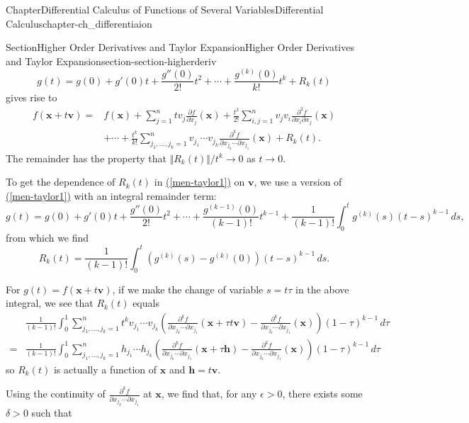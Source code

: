 \documentclass[oneside,10pt,]{book}
\newcommand{\xreffont}{\relax}
\numberwithin{equation}{section}
\newcommand{\bh}{\mathbf{h}}
\newcommand{\bv}{\mathbf{v}}
\newcommand{\bx}{\mathbf{x}}
\newcommand{\amp}{&}
\begin{document}
\begin{chapterptx}{Chapter}{Differential Calculus of Functions of Several Variables}{}{Differential Calculus}{}{}{chapter-ch_differentiaion}
\begin{sectionptx}{Section}{Higher Order Derivatives and Taylor Expansion}{}{Higher Order Derivatives and Taylor Expansion}{}{}{section-section-higherderiv}
\begin{equation}
g(t)=g(0)+g'(0)t+\frac{g''(0)}{2!}t^{2}+\cdots+ \frac{g^{(k)}(0)}{k!}
t^{k} +R_{k}(t)\label{men-taylor1}
\end{equation}
gives rise to%
\begin{align*}
f(\bx+ t\bv)= \amp f(\bx)+	\sum_{j=1}^{n} t v_{j}\frac{\partial f}{\partial x_{j}}(\bx)+
\frac{t^{2}}{2!} \sum_{i, j=1}^{n} v_{j}v_{i}\frac{\partial^{2} f}{\partial x_{i}\partial x_{j}}(\bx)\\
\amp +\cdots +  \frac{t^{k}}{k!}\sum_{j_{1},\ldots,j_{k}=1}^{n} v_{j_{1}}\cdots v_{j_{k}}\frac{\partial^{k} f}{\partial x_{j_{k}}\cdots \partial x_{j_{1}}}(\bx)+R_{k}(t).
\end{align*}
The remainder has the property that \(\Vert R_{k}(t)\Vert/t^{k} \to 0\) as \(t \to 0\).%
\par
To get  the dependence	of \(R_{k}(t)\) in  \hyperref[men-taylor1]{({\xreffont\ref{men-taylor1}})} on \(\bv\), we use a version of  \hyperref[men-taylor1]{({\xreffont\ref{men-taylor1}})} with an integral remainder term:%
\begin{equation}
g(t)=g(0)+g'(0)t+\frac{g''(0)}{2!}t^{2}+\cdots+ \frac{g^{(k-1)}(0)}{(k-1)!}t^{k-1}
+\frac{1}{(k-1)!}\int_{0}^{t}g^{(k)}(s)(t-s)^{k-1}\, ds\text{,}\label{men-eq-remainder}
\end{equation}
from which we find%
\begin{equation*}
R_{k}(t)=\frac{1}{(k-1)!}\int_{0}^{t}\left( g^{(k)}(s)- g^{(k)}(0)\right) (t-s)^{k-1}\, ds.
\end{equation*}
%
\par
For \(g(t)=f(\bx +t\bv)\), if we make the change of variable \(s=t \tau\) in the above integral, we see that \(R_{k}(t)\) equals%
\begin{align*}
\amp \frac{1}{(k-1)!}\int_{0}^{1}
\sum_{j_{1},\ldots, j_{k}=1}^{n} t^{k} v_{j_{1}}\cdots v_{j_{k}}
\left( \frac{\partial^{k} f}{\partial x_{j_{k}}\cdots \partial x_{j_{1}}}(\bx+ \tau t\bv)-
\frac{\partial^{k} f}{\partial x_{j_{k}}\cdots \partial x_{j_{1}}}(\bx)\right) (1-\tau)^{k-1}\, d\tau\\
=\amp  \frac{1}{(k-1)!}\int_{0}^{1}
\sum_{j_{1},\ldots, j_{k}=1}^{n} h_{j_{1}}\cdots h_{j_{k}}
\left( \frac{\partial^{k} f}{\partial x_{j_{k}}\cdots \partial x_{j_{1}}}(\bx+ \tau \bh)-
\frac{\partial^{k} f}{\partial x_{j_{k}}\cdots \partial x_{j_{1}}}(\bx)\right) (1-\tau)^{k-1}\, d\tau
\end{align*}
so \(R_{k}(t)\) is actually a function of \(\bx\) and \(\bh=t\bv\).%
\par
Using the continuity of \(\frac{\partial^{k} f}{\partial x_{j_{k}}\cdots \partial x_{j_{1}}}\) at \(\bx\), we find that, for any \(\epsilon > 0\), there exists some \(\delta >0\) such that%

\end{sectionptx}
\end{chapterptx}
\end{document}
